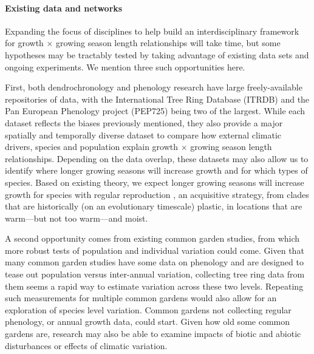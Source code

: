 \documentclass[11pt]{article}
\begin{document}
\paragraph{Existing data and networks}

Expanding the focus of disciplines to help build an interdisciplinary framework for growth $\times$ growing season length relationships will take time, but some hypotheses may be tractably tested by taking advantage of existing data sets and ongoing experiments. We mention three such opportunities here. 

First, both dendrochronology and phenology research have large freely-available repositories of data, with the International Tree Ring Database (ITRDB) and the Pan European Phenology project (PEP725) being two of the largest. While each dataset reflects the biases previously mentioned, they also provide a major spatially and temporally diverse dataset to compare how external climatic drivers, species and population explain growth $\times$ growing season length relationships. Depending on the data overlap, these datasets may also allow us to identify  where longer growing seasons will increase growth and for which types of species. Based on existing theory, we expect longer growing seasons will increase growth for species with regular reproduction \citep[no masting, see also new masting database in][]{hacket2022mastree+}, an acquisitive strategy, from clades that are historically (on an evolutionary timescale) plastic, in locations that are warm---but not too warm---and moist.%

A second opportunity comes from existing common garden studies, from which more robust tests of population and individual variation could come. Given that many common garden studies have some data on phenology and are designed to tease out population versus inter-annual variation, collecting tree ring data from them seems a rapid way to estimate variation across these two levels. Repeating such measurements for multiple common gardens would also allow for an exploration of species level variation. Common gardens not collecting regular phenology, or annual growth data, could start. Given how old some common gardens are, research may also be able to examine impacts of biotic and abiotic disturbances or effects of climatic variation. 
\end{document}

